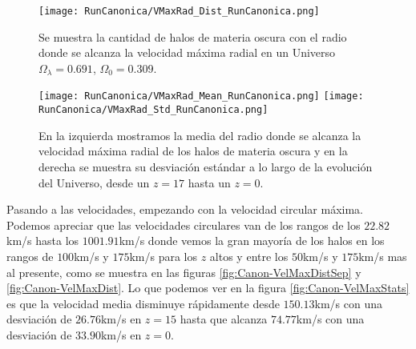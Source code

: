 \begin{figure}[H]
    \centering
    \texttt{[image: RunCanonica/VMaxRad\_Dist\_RunCanonica.png]}
    \caption[Distribución del radio donde se alcanza la velocidad máxima radial de un Universo $\Omega_\lambda = 0.691 $, $\Omega_0 = 0.309$]{\footnotesize Se muestra la cantidad de halos de materia oscura con el radio donde se alcanza la velocidad máxima radial en un Universo $\Omega_\lambda = 0.691 $, $\Omega_0 = 0.309$.}
    \label{fig:Canon-VMaxRadDist}
\end{figure}

\begin{figure}[H]
    \centering
    \texttt{[image: RunCanonica/VMaxRad\_Mean\_RunCanonica.png]}
    \texttt{[image: RunCanonica/VMaxRad\_Std\_RunCanonica.png]}
    \caption[Media y desviación estándar del Radio donde se alcanza la velocidad máxima radial de un Universo $\Omega_\lambda = 0.691 $, $\Omega_0 = 0.309$]{\footnotesize En la izquierda mostramos la media del radio donde se alcanza la velocidad máxima radial de los halos de materia oscura y en la derecha se muestra su desviación estándar a lo largo de la evolución del Universo, desde un $z=17$ hasta un $z=0$.}
    \label{fig:Canon-VMaxRadStats}
\end{figure}

Pasando a las velocidades, empezando con la velocidad circular máxima. Podemos apreciar que las velocidades circulares van de los rangos de los $22.82$km/s hasta los $1001.91$km/s donde vemos la gran mayoría de los halos en los rangos de $100$km/s y $175$km/s para los $z$ altos y entre los $50$km/s y $175$km/s mas al presente, como se muestra en las figuras \ref{fig:Canon-VelMaxDistSep} y \ref{fig:Canon-VelMaxDist}. Lo que podemos ver en la figura \ref{fig:Canon-VelMaxStats} es que la velocidad  media disminuye rápidamente desde $150.13$km/s con una desviación de $26.76$km/s en $z=15$ hasta que alcanza $74.77$km/s con una desviación de $33.90$km/s en $z=0$.


